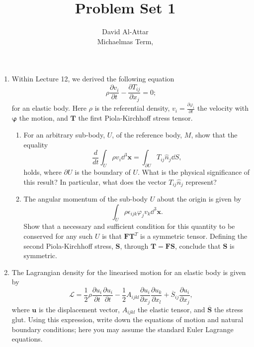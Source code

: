 \documentclass[a4paper,10pt]{paper}
\title{Problem Set 1}
\author{David Al-Attar \\ Michaelmas Term, \the\year}
\begin{document}
\maketitle

\begin{enumerate}

\item Within Lecture 12, we derived the following equation
\begin{equation*}
    \rho\frac{\partial v_{i}}{\partial t}-\frac{\partial T_{ij}}{\partial x_{j}}=0;
\end{equation*}
for an elastic body. Here $\rho$ is the referential density, $v_{i} = \frac{\partial \varphi_{i}}{\partial t}$ the velocity with $\bm{\varphi}$ the motion, and $\mathbf{T}$ the first Piola-Kirchhoff stress tensor.

\begin{enumerate}
     \item 
     For an arbitrary sub-body, $U$, of the reference body, $M$, show that the equality
    \begin{equation*}
        \frac{d}{dt}\int_{U}\rho v_{i}\dd^{3}\mathbf{x}=\int_{\partial U}T_{ij}\hat{n}_{j}\dd S,
    \end{equation*}
    holds, where $\partial U$ is the boundary of $U$. What is the physical significance of this result? In particular, what does the vector $T_{ij}\hat{n}_{j}$ represent?


    \item
    The angular momentum of the sub-body $U$ about the origin is given by
    \begin{equation*}
        \int_{U}\rho\epsilon_{ijk}\varphi_{j}v_{k}\dd^{3}\mathbf{x}.
    \end{equation*}
    Show that a necessary and sufficient condition for this quantity to be conserved for any such $U$ is that $\mathbf{F}\mathbf{T}^{T}$ is a symmetric tensor. Defining the second Piola-Kirchhoff stress, $\mathbf{S}$, through $\mathbf{T}=\mathbf{F}\mathbf{S}$, conclude that $\mathbf{S}$ is symmetric.

   
    

\end{enumerate}

\item The Lagrangian density for the linearised motion for an elastic body is given by
\begin{equation*}
    \mathcal{L}=\frac{1}{2}\rho\frac{\partial u_{i}}{\partial t}\frac{\partial u_{i}}{\partial t}-\frac{1}{2}A_{ijkl}\frac{\partial u_{i}}{\partial x_{j}}\frac{\partial u_{k}}{\partial x_{l}}+\overline{S}_{ij}\frac{\partial u_{i}}{\partial x_{j}},
\end{equation*}
where $\mathbf{u}$ is the displacement vector, $A_{ijkl}$ the elastic tensor, and $\overline{\mathbf{S}}$ the stress glut. Using this expression, write down the equations of motion and natural boundary conditions; here you may assume the standard Euler Lagrange equations.


\end{enumerate}
\end{document}
